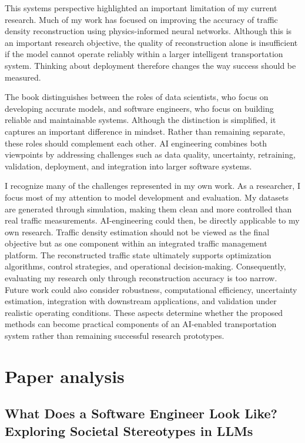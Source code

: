 \documentclass{article}
\begin{document}
This systems perspective highlighted an important limitation of my current research. 
Much of my work has focused on improving the accuracy of traffic density reconstruction using physics-informed neural networks. 
Although this is an important research objective, the quality of reconstruction alone is insufficient if the model cannot operate reliably within a larger intelligent transportation system. 
Thinking about deployment therefore changes the way success should be measured.

The book distinguishes between the roles of data scientists, who focus on developing accurate models, and software engineers, who focus on building reliable and maintainable systems. 
Although the distinction is simplified, it captures an important difference in mindset. 
Rather than remaining separate, these roles should complement each other. 
AI engineering combines both viewpoints by addressing challenges such as data quality, uncertainty, retraining, validation, deployment, and integration into larger software systems.

I recognize many of the challenges represented in my own work. 
As a researcher, I focus most of my attention to model development and evaluation. 
My datasets are generated through simulation, making them clean and more controlled than real traffic measurements. 
AI-engineering could then, be directly applicable to my own research. 
Traffic density estimation should not be viewed as the final objective but as one component within an integrated traffic management platform. 
The reconstructed traffic state ultimately supports optimization algorithms, control strategies, and operational decision-making. 
Consequently, evaluating my research only through reconstruction accuracy is too narrow. 
Future work could also consider robustness, computational efficiency, uncertainty estimation, integration with downstream applications, and validation under realistic operating conditions. 
These aspects determine whether the proposed methods can become practical components of an AI-enabled transportation system rather than remaining successful research prototypes.

\section{Paper analysis}
\subsection{What Does a Software Engineer Look Like? Exploring Societal Stereotypes in LLMs}
\end{document}
